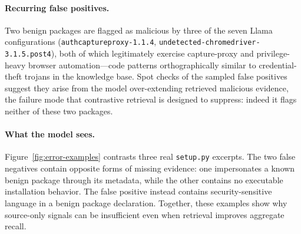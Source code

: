 \paragraph{Recurring false positives.} Two benign packages are flagged as
malicious by three of the seven Llama configurations
(\texttt{authcaptureproxy-1.1.4},
\texttt{undetected-chromedriver-3.1.5.post4}),
both of which legitimately exercise capture-proxy and privilege-heavy browser
automation---code patterns orthographically similar to credential-theft
trojans in the knowledge base. Spot checks of the sampled false positives
suggest they arise from the model over-extending retrieved malicious
evidence, the failure mode that contrastive retrieval is designed to
suppress: indeed it flags neither of these two packages.

\paragraph{What the model sees.} Figure~\ref{fig:error-examples} contrasts
three real \texttt{setup.py} excerpts. The two false negatives contain
opposite forms of missing evidence: one impersonates a known benign package
through its metadata, while the other contains no executable installation
behavior. The false positive instead contains security-sensitive language in
a benign package declaration. Together, these examples show why source-only
signals can be insufficient even when retrieval improves aggregate recall.

